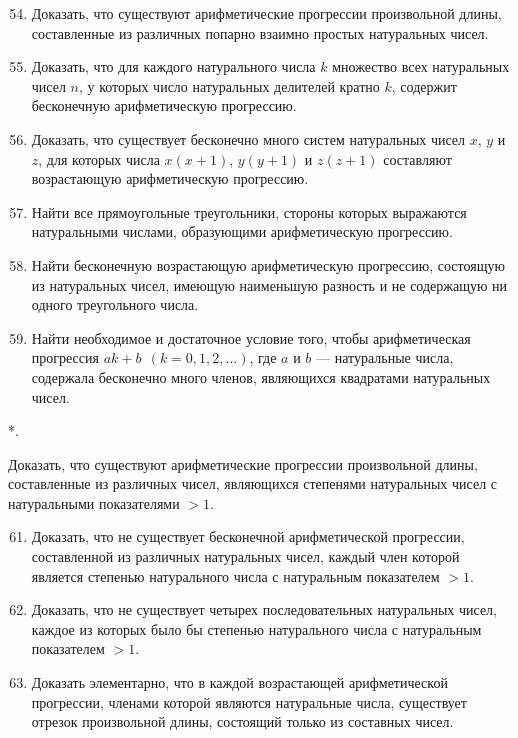 \documentclass[12pt, a4paper, openany]{book}
\newcounter{namedlistcounter}  %
\newenvironment{withdot}
{\begin{list}
		{\arabic{namedlistcounter}*.} %
		{\usecounter{namedlistcounter}   %
			\setlength{\leftmargin}{3em}} %
	}
	{\end{list}}
\begin{document}
\begin{enumerate}
	\setcounter{enumi}{53}
	\item Доказать, что существуют арифметические прогрессии произвольной длины, составленные из различных попарно взаимно простых	натуральных чисел.
	\item Доказать, что для каждого натурального числа $k$ множество всех натуральных чисел $n$, у которых число натуральных делителей кратно $k$, содержит бесконечную арифметическую прогрессию.
	\item Доказать, что существует бесконечно много систем натуральных чисел $x$, $y$ и $z$, для которых числа $x(x+1)$, $y(y+1)$ и $z(z+1)$ составляют возрастающую арифметическую прогрессию.
	\item Найти все прямоугольные треугольники, стороны которых выражаются натуральными числами, образующими арифметическую прогрессию.
	\item Найти бесконечную возрастающую арифметическую прогрессию,	состоящую из натуральных чисел, имеющую наименьшую разность и не содержащую ни одного треугольного числа.
	\item Найти необходимое и достаточное условие того, чтобы арифметическая прогрессия $ak+b \ \ (k=0,1,2, ...)$, где $a$ и $b$ — натуральные числа, содержала бесконечно много членов, являющихся квадратами натуральных чисел.
\end{enumerate}

\begin{withdot}
	\addtocounter{namedlistcounter}{59}
	\item Доказать, что существуют арифметические прогрессии произвольной длины, составленные из различных чисел, являющихся степенями натуральных чисел с натуральными показателями $>1$.
\end{withdot}

\begin{enumerate}
	\setcounter{enumi}{60}
	\item Доказать, что не существует бесконечной арифметической прогрессии, составленной из различных натуральных чисел, каждый член которой является степенью натурального числа с натуральным показателем $>1$.
	\item Доказать, что не существует четырех последовательных натуральных чисел, каждое из которых было бы степенью натурального числа с натуральным показателем $>1$.
	\item Доказать элементарно, что в каждой возрастающей арифметической прогрессии, членами которой являются натуральные числа, существует отрезок произвольной длины, состоящий только из составных чисел.
\end{enumerate}
\end{document}
